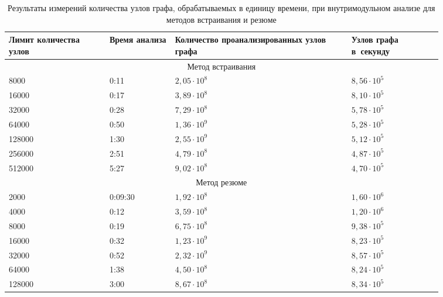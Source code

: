 \begin{table}
\renewcommand{\arraystretch}{1.2}
\begin{tabular}{| p{0.2\linewidth} | p{0.13\linewidth} | p{0.35\linewidth} | p{0.18\linewidth} |} 
\hline
Лимит количества узлов & Время анализа & Количество проанализированных узлов графа & Узлов графа в~секунду \\
\hline
\multicolumn{4}{|c|}{Метод встраивания} \\
\hline
\hline
8000      &   0:11       & $2,05 \cdot 10^8$  & $8,56 \cdot 10^5$ \\
\hline
16000     &   0:17       & $3,89 \cdot 10^8$  & $8,10 \cdot 10^5$ \\
\hline
32000     &   0:28       & $7,29 \cdot 10^8$  & $5,78 \cdot 10^5$ \\
\hline
64000     &   0:50       & $1,36 \cdot 10^9$  & $5,28 \cdot 10^5$ \\
\hline
128000    &   1:30       & $2,55 \cdot 10^9$  & $5,12 \cdot 10^5$ \\
\hline
256000    &   2:51       & $4,79 \cdot 10^8$  & $4,87 \cdot 10^5$ \\
\hline
512000    &   5:27       & $9,02 \cdot 10^8$  & $4,70 \cdot 10^5$ \\
\hline
\hline
\multicolumn{4}{|c|}{Метод резюме} \\
\hline
\hline
2000      &   0:09:30       & $1,92 \cdot 10^8$  & $1,60 \cdot 10^6$ \\
\hline
4000      &   0:12       & $3,59 \cdot 10^8$  & $1,20 \cdot 10^6$ \\
\hline
8000      &   0:19       & $6,75 \cdot 10^8$  & $9,38 \cdot 10^5$ \\
\hline
16000     &   0:32       & $1,23 \cdot 10^9$  & $8,23 \cdot 10^5$ \\
\hline
32000     &   0:52       & $2,32 \cdot 10^9$  & $8,57 \cdot 10^5$ \\
\hline
64000     &   1:38       & $4,50 \cdot 10^8$  & $8,24 \cdot 10^5$ \\
\hline
128000    &   3:00       & $8,67 \cdot 10^8$  & $8,34 \cdot 10^5$ \\
\hline
\hline

\end{tabular}
\caption{Результаты измерений количества узлов графа, обрабатываемых в единицу времени, при внутримодульном анализе для методов встраивания и резюме} \label{table:time-nodes-single}
\end{table}



